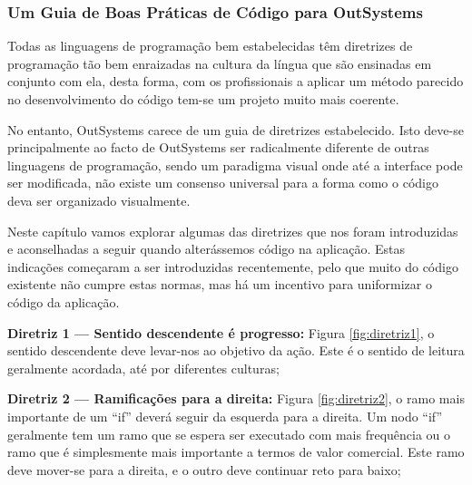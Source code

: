 \subsubsection{Um Guia de Boas Práticas de Código para OutSystems}\label{secsec:um-guia-de-estilo-de-codigo}

    Todas as linguagens de programação bem estabelecidas têm diretrizes de programação tão bem enraizadas na cultura da língua que são ensinadas em conjunto com ela, desta forma, com os profissionais a aplicar um método parecido no desenvolvimento do código tem-se um projeto muito mais coerente.

    No entanto, OutSystems carece de um guia de diretrizes estabelecido. Isto deve-se principalmente ao facto de OutSystems ser radicalmente diferente de outras linguagens de programação, sendo um paradigma visual onde até a interface pode ser modificada, não existe um consenso universal para a forma como o código deva ser organizado visualmente.

    Neste capítulo vamos explorar algumas das diretrizes que nos foram introduzidas e aconselhadas a seguir quando alterássemos código na aplicação. Estas indicações começaram a ser introduzidas recentemente, pelo que muito do código existente não cumpre estas normas, mas há um incentivo para uniformizar o código da aplicação.

    \textbf{Diretriz 1 — Sentido descendente é progresso:} Figura \ref{fig:diretriz1}, o sentido descendente deve levar-nos ao objetivo da ação. Este é o sentido de leitura geralmente acordada, até por diferentes culturas;

    \textbf{Diretriz 2 — Ramificações para a direita:} Figura \ref{fig:diretriz2}, o ramo mais importante de um ``if'' deverá seguir da esquerda para a direita. Um nodo ``if'' geralmente tem um ramo que se espera ser executado com mais frequência ou o ramo que é simplesmente mais importante a termos de valor comercial. Este ramo deve mover-se para a direita, e o outro deve 
    continuar reto para baixo;


